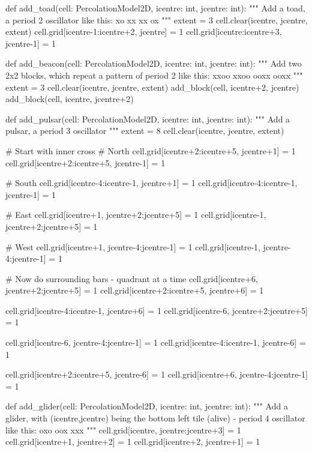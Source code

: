 \documentclass[bibend=bibtex,lang=cn,11pt,a4paper]{elegantpaper}
\begin{document}
\begin{python}
def add_toad(cell: PercolationModel2D, icentre: int, jcentre: int):
    """
    Add a toad, a period 2 oscillator
    like this:
        xo\n
        xx\n
        xx\n
        ox\n
    """
    extent = 3
    cell.clear(icentre, jcentre, extent)
    cell.grid[icentre-1:icentre+2, jcentre] = 1
    cell.grid[icentre:icentre+3, jcentre-1] = 1


def add_beacon(cell: PercolationModel2D, icentre: int, jcentre: int):
    """
    Add two 2x2 blocks, which repeat a pattern of period 2
    like this:
        xxoo\n
        xxoo\n
        ooxx\n
        ooxx\n
    """
    extent = 3
    cell.clear(icentre, jcentre, extent)
    add_block(cell, icentre+2, jcentre)
    add_block(cell, icentre, jcentre+2)


def add_pulsar(cell: PercolationModel2D, icentre: int, jcentre: int):
    """
    Add a pulsar, a period 3 oscillator
    """
    extent = 8
    cell.clear(icentre, jcentre, extent)

    # Start with inner cross
    # North
    cell.grid[icentre+2:icentre+5, jcentre+1] = 1
    cell.grid[icentre+2:icentre+5, jcentre-1] = 1

    # South
    cell.grid[icentre-4:icentre-1, jcentre+1] = 1
    cell.grid[icentre-4:icentre-1, jcentre-1] = 1

    # East
    cell.grid[icentre+1, jcentre+2:jcentre+5] = 1
    cell.grid[icentre-1, jcentre+2:jcentre+5] = 1

    # West
    cell.grid[icentre+1, jcentre-4:jcentre-1] = 1
    cell.grid[icentre-1, jcentre-4:jcentre-1] = 1

    # Now do surrounding bars - quadrant at a time
    cell.grid[icentre+6, jcentre+2:jcentre+5] = 1
    cell.grid[icentre+2:icentre+5, jcentre+6] = 1

    cell.grid[icentre-4:icentre-1, jcentre+6] = 1
    cell.grid[icentre-6, jcentre+2:jcentre+5] = 1

    cell.grid[icentre-6, jcentre-4:jcentre-1] = 1
    cell.grid[icentre-4:icentre-1, jcentre-6] = 1

    cell.grid[icentre+2:icentre+5, jcentre-6] = 1
    cell.grid[icentre+6, jcentre-4:jcentre-1] = 1


def add_glider(cell: PercolationModel2D, icentre: int, jcentre: int):
    """
    Add a glider, with (icentre,jcentre) being the bottom left tile (alive) - period 4 oscillator
    like this:
        oxo\n
        oox\n
        xxx\n
    """
    cell.grid[icentre, jcentre:jcentre+3] = 1
    cell.grid[icentre+1, jcentre+2] = 1
    cell.grid[icentre+2, jcentre+1] = 1



\end{python}
\end{document}
